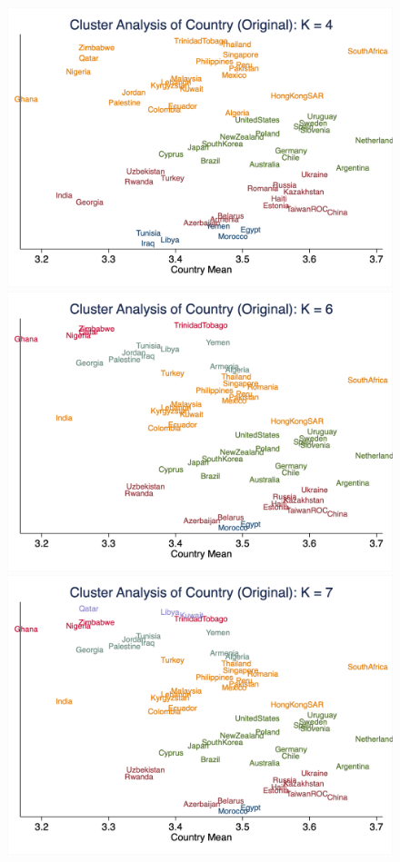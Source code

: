 \documentclass[10pt,leqno]{article}
\begin{document}
\begin{figure}  [h!]
\begin{center}
\includegraphics[scale=0.15]{CA_CountryK4_ORI.png}
\includegraphics[scale=0.15]{CA_CountryK6_ORI.png}
\includegraphics[scale=0.15]{CA_CountryK7_ORI.png}

\end{center}
\end{figure}
\end{document}
